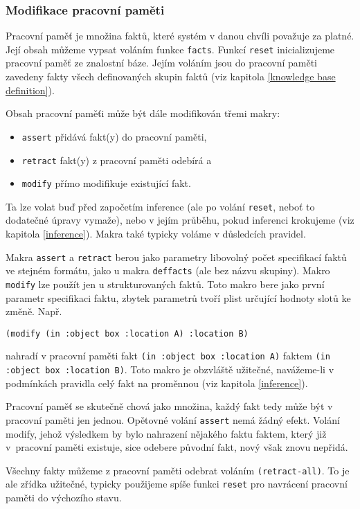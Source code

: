 \subsubsection{Modifikace pracovní paměti}
\label{modifikace}

Pracovní paměť je množina faktů, které systém v danou chvíli považuje za platné.
Její obsah můžeme vypsat voláním funkce \verb|facts|. Funkcí \verb|reset|
inicializujeme pracovní paměť ze znalostní báze. Jejím voláním jsou do pracovní
paměti zavedeny fakty všech definovaných skupin faktů (viz kapitola
\ref{knowledge base definition}).

Obsah pracovní paměťi může být dále modifikován třemi makry:
\begin{itemize}
  \item \verb|assert| přidává fakt(y) do pracovní paměti,
  \item \verb|retract| fakt(y) z pracovní paměti odebírá a
  \item \verb|modify| přímo modifikuje existující fakt.
\end{itemize}
Ta lze volat buď před započetím inference (ale po volání \verb|reset|, neboť to
dodatečné úpravy vymaže), nebo v jejím průběhu, pokud inferenci krokujeme (viz
kapitola \ref{inference}). Makra také typicky voláme v důsledcích pravidel.

Makra \verb|assert| a \verb|retract| berou jako parametry libovolný počet
specifikací faktů ve stejném formátu, jako u makra \verb|deffacts| (ale bez
názvu skupiny). Makro \verb|modify| lze použít jen u strukturovaných faktů. Toto
makro bere jako první parametr specifikaci faktu, zbytek parametrů tvoří plist
určující hodnoty slotů ke změně. Např.
\begin{verbatim}
(modify (in :object box :location A) :location B)
\end{verbatim}
nahradí v pracovní paměti fakt \verb|(in :object box :location A)| faktem
\verb|(in :object box :location B)|.
Toto makro je obzvláště užitečné, navážeme-li v podmínkách pravidla celý fakt na
proměnnou (viz kapitola \ref{inference}).

Pracovní paměť se skutečně chová jako množina, každý fakt tedy může být v
pracovní paměti jen jednou. Opětovné volání \verb|assert| nemá žádný efekt.
Volání modify, jehož výsledkem by bylo nahrazení nějakého faktu faktem, který
již v~pracovní paměti existuje, sice odebere původní fakt, nový však znovu
nepřidá.

Všechny fakty můžeme z pracovní paměti odebrat voláním \verb|(retract-all)|. To
je ale zřídka užitečné, typicky použijeme spíše funkci \verb|reset| pro
navrácení pracovní paměti do výchozího stavu.
